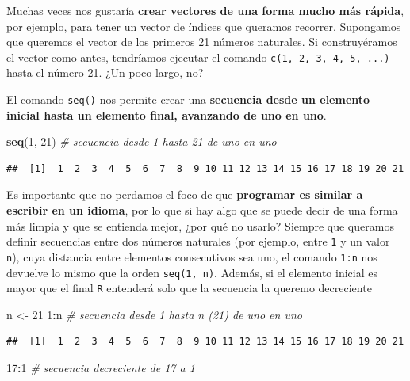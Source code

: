 \documentclass[11pt,]{book}
\newenvironment{Shaded}{\begin{snugshade}}{\end{snugshade}}
\newcommand{\CommentTok}[1]{\textcolor[rgb]{0.37,0.37,0.37}{\textit{#1}}}
\newcommand{\DecValTok}[1]{\textcolor[rgb]{0.06,0.06,0.06}{#1}}
\newcommand{\KeywordTok}[1]{\textcolor[rgb]{0.27,0.27,0.27}{\textbf{#1}}}
\newcommand{\NormalTok}[1]{#1}
\newcommand{\OperatorTok}[1]{\textcolor[rgb]{0.43,0.43,0.43}{\textbf{#1}}}
\newcommand{\StringTok}[1]{\textcolor[rgb]{0.5,0.5,0.5}{#1}}
\begin{document}
Muchas veces nos gustaría \textbf{crear vectores de una forma mucho más rápida}, por ejemplo, para tener un vector de índices que queramos recorrer. Supongamos que queremos el vector de los primeros 21 números naturales. Si construyéramos el vector como antes, tendríamos ejecutar el comando \texttt{c(1,\ 2,\ 3,\ 4,\ 5,\ ...)} hasta el número 21. ¿Un poco largo, no?

El comando \texttt{seq()} nos permite crear una \textbf{secuencia desde un elemento inicial hasta un elemento final, avanzando de uno en uno}.

\begin{Shaded}
\begin{Highlighting}[]
\KeywordTok{seq}\NormalTok{(}\DecValTok{1}\NormalTok{, }\DecValTok{21}\NormalTok{) }\CommentTok{# secuencia desde 1 hasta 21 de uno en uno}
\end{Highlighting}
\end{Shaded}

\begin{verbatim}
##  [1]  1  2  3  4  5  6  7  8  9 10 11 12 13 14 15 16 17 18 19 20 21
\end{verbatim}

Es importante que no perdamos el foco de que \textbf{programar es similar a escribir en un idioma}, por lo que si hay algo que se puede decir de una forma más limpia y que se entienda mejor, ¿por qué no usarlo? Siempre que queramos definir secuencias entre dos números naturales (por ejemplo, entre \texttt{1} y un valor \texttt{n}), cuya distancia entre elementos consecutivos sea uno, el comando \texttt{1:n} nos devuelve lo mismo que la orden \texttt{seq(1,\ n)}. Además, si el elemento inicial es mayor que el final \texttt{R} entenderá solo que la secuencia la queremo decreciente

\begin{Shaded}
\begin{Highlighting}[]
\NormalTok{n <-}\StringTok{ }\DecValTok{21}
\DecValTok{1}\OperatorTok{:}\NormalTok{n }\CommentTok{# secuencia desde 1 hasta n (21) de uno en uno}
\end{Highlighting}
\end{Shaded}

\begin{verbatim}
##  [1]  1  2  3  4  5  6  7  8  9 10 11 12 13 14 15 16 17 18 19 20 21
\end{verbatim}

\begin{Shaded}
\begin{Highlighting}[]
\DecValTok{17}\OperatorTok{:}\DecValTok{1} \CommentTok{# secuencia decreciente de 17 a 1}
\end{Highlighting}
\end{Shaded}
\end{document}
